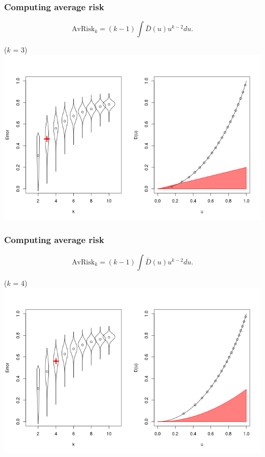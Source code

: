 \documentclass{beamer}
\begin{document}
\begin{frame}
\frametitle{Computing average risk}
\[
\text{AvRisk}_k = (k-1) \int \bar{D}(u) u^{k-2} du.
\]
\begin{center}
($k$ = 3)
\includegraphics[scale = 0.4, clip=true, trim=0 0.1in 0 0.7in]{../extrapolation/rho_0_7_fmla3.png}
\end{center}
\end{frame}

\begin{frame}
\frametitle{Computing average risk}
\[
\text{AvRisk}_k = (k-1) \int \bar{D}(u) u^{k-2} du.
\]
\begin{center}
($k$ = 4)
\includegraphics[scale = 0.4, clip=true, trim=0 0.1in 0 0.7in]{../extrapolation/rho_0_7_fmla4.png}
\end{center}
\end{frame}
\end{document}
